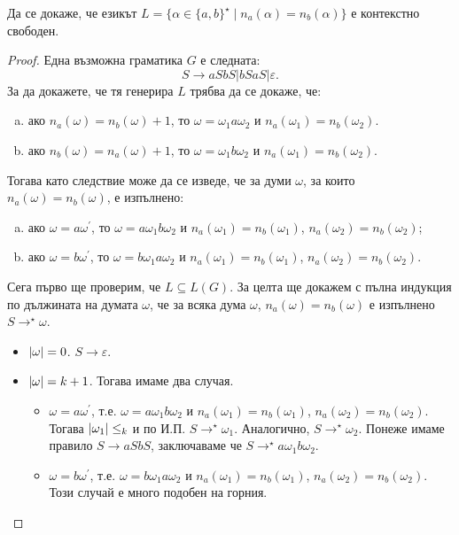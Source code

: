 \begin{problem}
  Да се докаже, че езикът $L = \{\alpha \in \{a,b\}^\star\mid n_a(\alpha) = n_b(\alpha)\}$ 
  е контекстно свободен.
\end{problem}
\begin{proof}
  Една възможна граматика $G$ е следната: 
  \[S \rightarrow aSbS\vert bSaS \vert\varepsilon.\]
  За да докажете, че тя генерира $L$ трябва да се докаже, че:
  \begin{enumerate}[a)]
  \item 
    ако $n_a(\omega) = n_b(\omega) + 1$, то
    $\omega = \omega_1 a \omega_2$ и $n_a(\omega_1) = n_b(\omega_2)$.
  \item
    ако $n_b(\omega) = n_a(\omega) + 1$, то
    $\omega = \omega_1 b \omega_2$ и $n_a(\omega_1) = n_b(\omega_2)$.
  \end{enumerate}
  Тогава като следствие може да се изведе, че за думи $\omega$, за които $n_a(\omega) = n_b(\omega)$,
  е изпълнено:
  \begin{enumerate}[a)]
  \item 
    ако $\omega = a\omega^\prime$, то
    $\omega = a\omega_1b\omega_2$ и $n_a(\omega_1) = n_b(\omega_1)$, $n_a(\omega_2) = n_b(\omega_2)$;
  \item
    ако $\omega = b\omega^\prime$, то
    $\omega = b\omega_1a\omega_2$ и $n_a(\omega_1) = n_b(\omega_1)$, $n_a(\omega_2) = n_b(\omega_2)$.
  \end{enumerate}

  Сега първо ще проверим, че $L \subseteq L(G)$.
  За целта ще докажем с пълна индукция по дължината на думата $\omega$, че за всяка дума $\omega$, $n_a(\omega) = n_b(\omega)$ е изпълнено
  $S \rightarrow^\star \omega$.
  \begin{itemize}
  \item 
    $\vert{\omega}\vert = 0$. $S \rightarrow \varepsilon$.
  \item
    $\vert{\omega}\vert = k+1$. Тогава имаме два случая.
    \begin{itemize}
    \item 
      $\omega = a\omega^\prime$, т.е. $\omega = a\omega_1b\omega_2$ и $n_a(\omega_1) = n_b(\omega_1)$, $n_a(\omega_2) = n_b(\omega_2)$.
      Тогава $\vert{\omega_1}\vert \leq_k$ и по И.П. $S \rightarrow^\star \omega_1$.
      Аналогично, $S \rightarrow^\star \omega_2$.
      Понеже имаме правило $S \rightarrow aSbS$, заключаваме че $S \rightarrow^\star a\omega_1b\omega_2$.
    \item
      $\omega = b\omega^\prime$, т.е. $\omega = b\omega_1a\omega_2$ и $n_a(\omega_1) = n_b(\omega_1)$, $n_a(\omega_2) = n_b(\omega_2)$.
      Този случай е много подобен на горния.
    \end{itemize}
  \end{itemize}
  

\end{proof}
